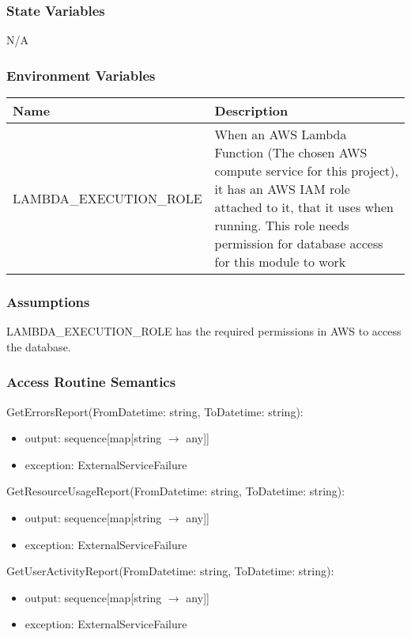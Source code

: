 \documentclass[12pt, titlepage]{article}
\begin{document}
\subsubsection{State Variables}

N/A
\subsubsection{Environment Variables}
\begin{center}
  \begin{tabular}{p{6cm} p{10cm}}
    \hline
    \textbf{Name} & \textbf{Description} \\
    \hline
    LAMBDA\_EXECUTION\_ROLE & When an AWS Lambda Function (The chosen
    AWS compute service for this project), it has an AWS IAM role
    attached to it, that it uses when running. This role needs
    permission for database access for this module to work \\
    \hline
  \end{tabular}
\end{center}

\subsubsection{Assumptions}

LAMBDA\_EXECUTION\_ROLE has the required permissions in AWS to access
the database.

\subsubsection{Access Routine Semantics}
\noindent GetErrorsReport(FromDatetime: string, ToDatetime: string):
\begin{itemize}
  \item output: sequence[map[string $\rightarrow$ any]]
  \item exception: ExternalServiceFailure
\end{itemize}

\noindent GetResourceUsageReport(FromDatetime: string, ToDatetime: string):
\begin{itemize}
  \item output: sequence[map[string $\rightarrow$ any]]
  \item exception: ExternalServiceFailure
\end{itemize}

\noindent GetUserActivityReport(FromDatetime: string, ToDatetime: string):
\begin{itemize}
  \item output: sequence[map[string $\rightarrow$ any]]
  \item exception: ExternalServiceFailure
\end{itemize}
\end{document}
